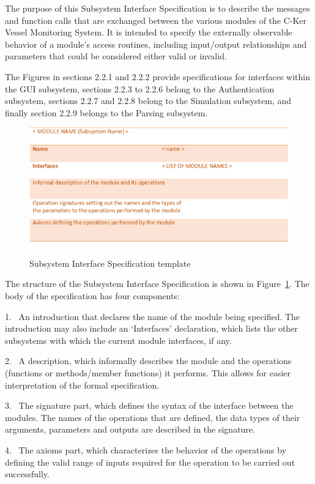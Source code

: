 \documentclass[12pt]{article}
\begin{document}
The purpose of this Subsystem Interface Specification is to describe the messages and function calls that are exchanged between the various modules of the C-Ker Vessel Monitoring System. It is intended to specify the externally observable behavior of a module’s access routines, including input/output relationships and parameters that could be considered either valid or invalid. 
\par
The Figures in sections 2.2.1 and 2.2.2 provide specifications for interfaces within the GUI subsystem, sections 2.2.3 to 2.2.6 belong to the Authentication subsystem, sections 2.2.7 and 2.2.8 belong to the Simulation subsystem, and finally section 2.2.9 belongs to the Parsing subsystem.
\par
\begin{figure}[h!]
    \centering
    \includegraphics[scale=0.9]{figure_2_2}
    \caption{Subsystem Interface Specification template}
    \label{fig:SubsystemInterfaceSpecificationTemplate}
\end{figure}
The structure of the Subsystem Interface Specification is shown in Figure~\ref{fig:SubsystemInterfaceSpecificationTemplate}. The body of the specification has four components:
\par

1.  \ An introduction that declares the name of the module being specified. The introduction may also include an ‘Interfaces’ declaration, which lists the other subsystems with which the current module interfaces, if any.\par
2.	\ A description, which informally describes the module and the operations (functions or methods/member functions) it performs. This allows for easier interpretation of the formal specification. \par
3.	\ The signature part, which defines the syntax of the interface between the modules. The names of the operations that are defined, the data types of their arguments, parameters and outputs are described in the signature.\par
4.	\ The axioms part, which characterizes the behavior of the operations by defining the valid range of inputs required for the operation to be carried out successfully.
\par
\end{document}
